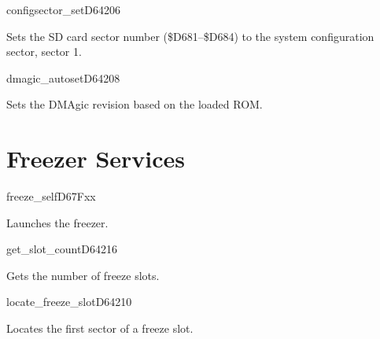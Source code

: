 \begin{hyppotrap}{configsector\_set}{D642}{06}
\item [Service:]
  Sets the SD card sector number (\$D681--\$D684) to the system configuration
  sector, sector 1.
\end{hyppotrap}


\begin{hyppotrap}{dmagic\_autoset}{D642}{08}
\item [Service:]
  Sets the DMAgic revision based on the loaded ROM.
\item [History:]
\end{hyppotrap}



\newpage
\section{Freezer Services}


\begin{hyppotrap}{freeze\_self}{D67F}{xx}
\item [Service:]
  Launches the freezer.
\item [History:]
\end{hyppotrap}


\begin{hyppotrap}{get\_slot\_count}{D642}{16}
\item [Service:]
  Gets the number of freeze slots.
\item [History:]
\end{hyppotrap}


\begin{hyppotrap}{locate\_freeze\_slot}{D642}{10}
\item [Service:]
  Locates the first sector of a freeze slot.
\item [History:]
\end{hyppotrap}



